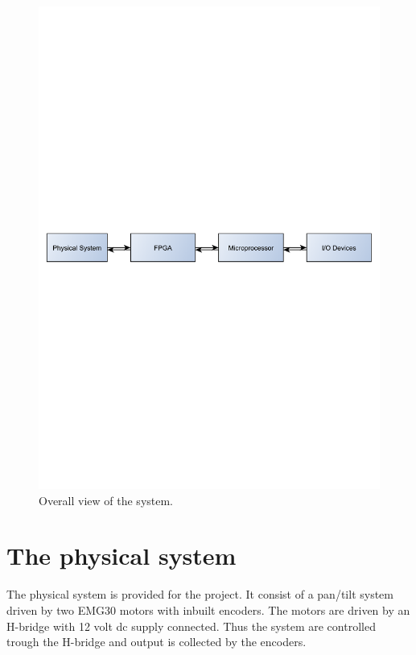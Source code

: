 \begin{figure}[htb]
	\centering
	\includegraphics[scale=0.6,trim=400 380 400 380]{graphics/firstsystem} %
	\caption{Overall view of the system.}
	\label{fig:firstsystem}			%
\end{figure}

\section{The physical system}\label{sec:phsycicalsystem}

The physical system is provided for the project. It consist of a pan/tilt system driven by two EMG30 \cite{emg30} motors with inbuilt encoders. The motors are driven by an H-bridge \cite{hbridge} with 12 volt dc supply connected. Thus the system are controlled trough the H-bridge and output is collected by the encoders.

